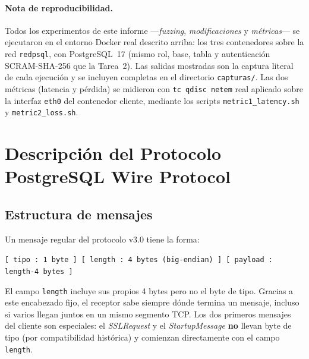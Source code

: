 \documentclass[11pt]{article}
\begin{document}
\paragraph{Nota de reproducibilidad.} Todos los experimentos de este informe
---\emph{fuzzing}, \emph{modificaciones} y \emph{métricas}--- se ejecutaron en el
entorno Docker real descrito arriba: los tres contenedores sobre la red
\texttt{redpsql}, con PostgreSQL~17 (mismo rol, base, tabla y autenticación
SCRAM-SHA-256 que la Tarea~2). Las salidas mostradas son la captura literal de
cada ejecución y se incluyen completas en el directorio \texttt{capturas/}. Las
dos métricas (latencia y pérdida) se midieron con \texttt{tc qdisc netem} real
aplicado sobre la interfaz \texttt{eth0} del contenedor cliente, mediante los
scripts \texttt{metric1\_latency.sh} y \texttt{metric2\_loss.sh}.

\section{Descripción del Protocolo PostgreSQL Wire Protocol}

\subsection{Estructura de mensajes}
Un mensaje regular del protocolo v3.0 tiene la forma:
\begin{center}
\texttt{[ tipo : 1 byte ] [ length : 4 bytes (big-endian) ] [ payload : length-4 bytes ]}
\end{center}
El campo \texttt{length} incluye sus propios 4 bytes pero no el byte de tipo.
Gracias a este encabezado fijo, el receptor sabe siempre dónde termina un
mensaje, incluso si varios llegan juntos en un mismo segmento TCP. Los dos
primeros mensajes del cliente son especiales: el \emph{SSLRequest} y el
\emph{StartupMessage} \textbf{no} llevan byte de tipo (por compatibilidad
histórica) y comienzan directamente con el campo \texttt{length}.
\end{document}

